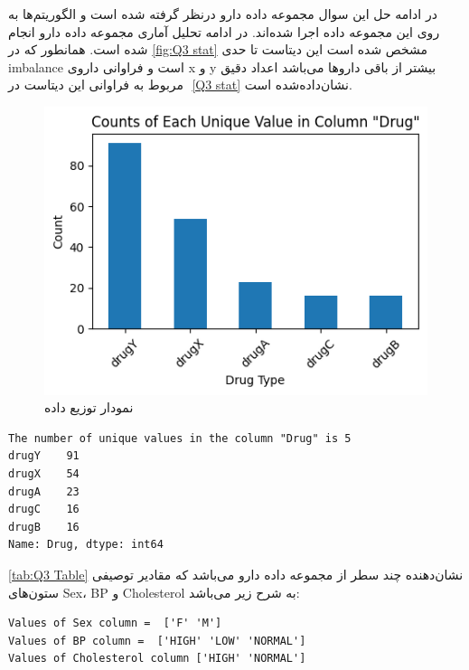 \documentclass{article}
\begin{document}
در ادامه حل این سوال مجموعه داده دارو درنظر گرفته شده است و الگوریتم‌ها به روی این مجموعه داده اجرا شده‌اند.
در ادامه تحلیل آماری مجموعه داده دارو انجام شده است. همانطور که در 
\autoref{fig:Q3 stat}
مشخص شده است این دیتاست تا حدی 
imbalance
است و فراوانی داروی x و y بیشتر از باقی داروها می‌باشد اعداد دقیق مربوط به فراوانی این دیتاست در ‎
\autoref{Q3 stat}
نشان‌داده‌شده است.
\begin{figure}[H]
\centering
\includegraphics[width=1\linewidth]{img/Q3/stat}
\caption{نمودار توزیع داده}
\label{fig:Q3 stat}
\end{figure}

\begin{LTR}
\label{Q3 stat}
\begin{verbatim}
The number of unique values in the column "Drug" is 5
drugY    91
drugX    54
drugA    23
drugC    16
drugB    16
Name: Drug, dtype: int64

\end{verbatim}
\end{LTR}

\autoref{tab:Q3 Table}
نشان‌دهنده چند سطر از مجموعه داده دارو می‌باشد که مقادیر توصیفی ستون‌های 
Sex، BP و Cholesterol 
به شرح زیر می‌باشد:
\begin{LTR}
\label{Q3 stat}
\begin{verbatim}
Values of Sex column =  ['F' 'M']
Values of BP column =  ['HIGH' 'LOW' 'NORMAL']
Values of Cholesterol column ['HIGH' 'NORMAL']
\end{verbatim}
\end{LTR}
\end{document}
